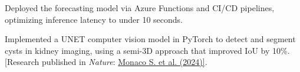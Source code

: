 \begin{cventries}
{\begin{cvitems}
      \item {Deployed the forecasting model via Azure Functions and CI/CD pipelines, optimizing inference latency to under 10 seconds.}
      \item {Implemented a UNET computer vision model in PyTorch to detect and segment cysts in kidney imaging, using a semi-3D approach that improved IoU by 10\%. [Research published in \textit{Nature}: \href{https://www.nature.com/articles/s41598-024-52677-1}{Monaco S. et al. (2024)]}.}
    \end{cvitems}
  }
\end{cventries}

